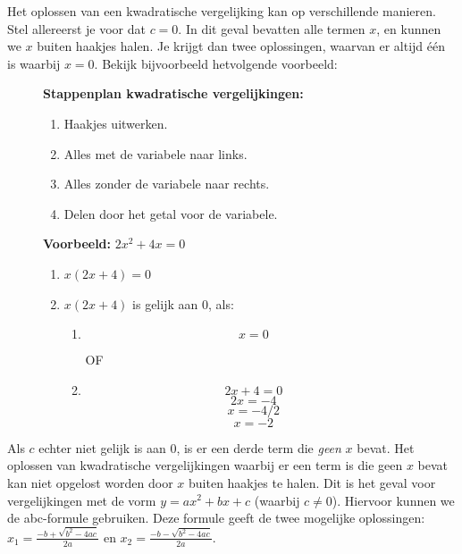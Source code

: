 \documentclass[
  a4paper,
]{scrbook}
\theoremstyle{definition}
\theoremstyle{remark}
\begin{document}
Het oplossen van een kwadratische vergelijking kan op verschillende
manieren. Stel allereerst je voor dat \(c = 0\). In dit geval bevatten
alle termen \(x\), en kunnen we \(x\) buiten haakjes halen. Je krijgt
dan twee oplossingen, waarvan er altijd één is waarbij \(x=0\). Bekijk
bijvoorbeeld hetvolgende voorbeeld:

\begin{figure}

\begin{minipage}[t]{0.45\linewidth}

{\centering 

\textbf{Stappenplan kwadratische vergelijkingen:}

\begin{enumerate}
\def\labelenumi{\arabic{enumi}.}
\item
  Haakjes uitwerken.
\item
  Alles met de variabele naar links.
\item
  Alles zonder de variabele naar rechts.
\item
  Delen door het getal voor de variabele.
\end{enumerate}

}

\end{minipage}%
%
\begin{minipage}[t]{0.55\linewidth}

{\centering 

\textbf{Voorbeeld:} \(2x^2 + 4x = 0\)

\begin{enumerate}
\def\labelenumi{\arabic{enumi}.}
\item
  \(x(2x+4) = 0\)
\item
  \(x(2x+4)\) is gelijk aan 0, als:

  \begin{enumerate}
  \def\labelenumii{\arabic{enumii}.}
  \item
    \[ x = 0 \]

    OF
  \item
    \[2x+4 = 0\] \[2x = -4\] \[x = -4/2\] \[x = -2\]
  \end{enumerate}
\end{enumerate}

}

\end{minipage}%

\end{figure}

Als \(c\) echter niet gelijk is aan \(0\), is er een derde term die
\emph{geen} \(x\) bevat. Het oplossen van kwadratische vergelijkingen
waarbij er een term is die geen \(x\) bevat kan niet opgelost worden
door \(x\) buiten haakjes te halen. Dit is het geval voor vergelijkingen
met de vorm \(y = ax^2 + bx + c\) (waarbij \(c \neq 0\)). Hiervoor
kunnen we de abc-formule gebruiken. Deze formule geeft de twee mogelijke
oplossingen: \(x_{1} = \frac{-b + \sqrt{b^2 - 4ac}}{2a}\) en
\(x_{2} = \frac{-b - \sqrt{b^2 - 4ac}}{2a}\).
\end{document}
